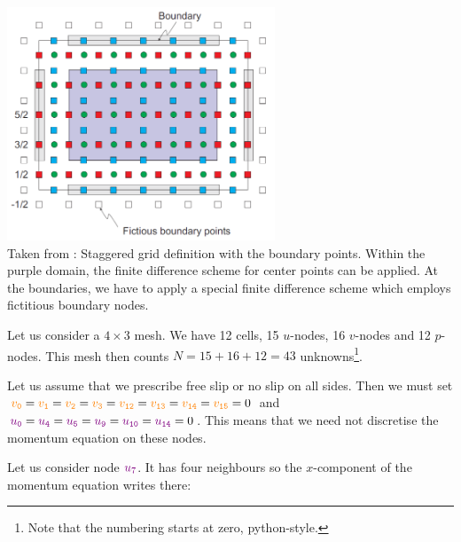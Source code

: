\begin{center}
\includegraphics[width=8cm]{images/fdm/bk_A}\\
{\captionfont Taken from \textcite{beka}: Staggered grid definition with the boundary points. 
Within the purple domain, the
finite difference scheme for center points can be applied. At the boundaries, we have to apply a
special finite difference scheme which employs fictitious boundary nodes.}
\end{center}

Let us consider a $4\times 3$ mesh.
We have 12 cells, 15 {\color{violet}$u$}-nodes, 
16 {\color{orange}$v$}-nodes and 12 {\color{teal}$p$}-nodes.
This mesh then counts $N=15+16+12=43$ unknowns\footnote{
Note that the numbering starts at zero, python-style.}.



Let us assume that we prescribe free slip or no slip on all sides.
Then we must set 
${\color{orange}v_{\tt 0}}={\color{orange}v_{\tt 1}}={\color{orange}v_{\tt 2}}={\color{orange}v_{\tt 3}}
={\color{orange}v_{\tt 12}}={\color{orange}v_{\tt 13}}={\color{orange}v_{\tt 14}}={\color{orange}v_{\tt 15}}=0$
and ${\color{violet} u_{\tt 0}}={\color{violet}u_{\tt 4}}={\color{violet}u_{\tt 5}}
={\color{violet}u_{\tt 9}}={\color{violet}u_{\tt 10}} = {\color{violet}u_{\tt 14}}=0$.
This means that we need not discretise the momentum equation on these nodes.

Let us consider node ${\color{violet} u_{7}}$. It has four neighbours so the $x$-component of 
the momentum equation writes there:

